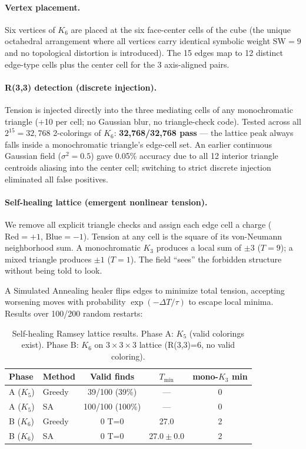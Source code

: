 \documentclass{article}
\begin{document}
\paragraph{Vertex placement.}
Six vertices of $K_6$ are placed at the six face-center cells of the cube
(the unique octahedral arrangement where all vertices carry identical symbolic
weight $\mathrm{SW}=9$ and no topological distortion is introduced).
The 15 edges map to 12 distinct edge-type cells plus the center cell for the 3 axis-aligned pairs.

\paragraph{R(3,3) detection (discrete injection).}
Tension is injected directly into the three mediating cells of any monochromatic triangle
(+10 per cell; no Gaussian blur, no triangle-check code).
Tested across all $2^{15}=32{,}768$ 2-colorings of $K_6$: \textbf{32,768/32,768 pass} —
the lattice peak always falls inside a monochromatic triangle's edge-cell set.
An earlier continuous Gaussian field ($\sigma^2=0.5$) gave 0.05\% accuracy due to all
12 interior triangle centroids aliasing into the center cell; switching to strict discrete
injection eliminated all false positives.

\paragraph{Self-healing lattice (emergent nonlinear tension).}
We remove all explicit triangle checks and assign each edge cell a charge
($\mathrm{Red}=+1$, $\mathrm{Blue}=-1$).  Tension at any cell is the square of its
von-Neumann neighborhood sum.  A monochromatic $K_3$ produces a local sum of $\pm3$
($T=9$); a mixed triangle produces $\pm1$ ($T=1$).  The field ``sees'' the forbidden
structure without being told to look.

A Simulated Annealing healer flips edges to minimize total tension, accepting worsening
moves with probability $\exp(-\Delta T/\tau)$ to escape local minima.
Results over 100/200 random restarts:

\begin{table}[h]
  \caption{Self-healing Ramsey lattice results. Phase A: $K_5$ (valid colorings exist).
           Phase B: $K_6$ on $3\!\times\!3\!\times\!3$ lattice (R(3,3)=6, no valid coloring).}
  \label{tab:ramsey}
  \centering
  \small
  \begin{tabular}{llccc}
    \toprule
    Phase & Method & Valid finds & $T_{\min}$ & mono-$K_3$ min \\
    \midrule
    A ($K_5$) & Greedy & 39/100 (39\%)  & —      & 0 \\
    A ($K_5$) & SA     & 100/100 (100\%) & —     & 0 \\
    B ($K_6$) & Greedy & 0 T=0           & 27.0   & 2 \\
    B ($K_6$) & SA     & 0 T=0           & $27.0\pm 0.0$ & 2 \\
    \bottomrule
  \end{tabular}
\end{table}
\end{document}
